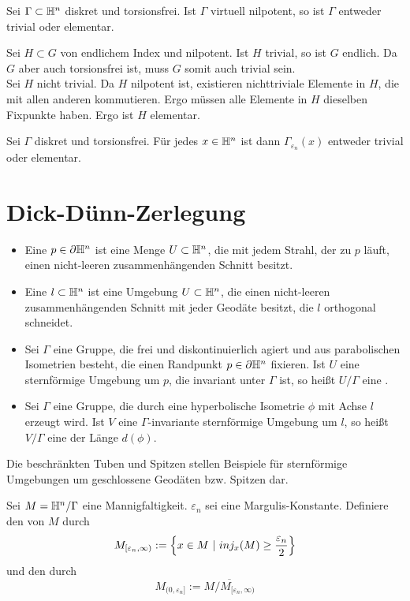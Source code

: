 \documentclass{book}
\renewcommand{\epsilon}{\varepsilon}
\newcommand{\thick}{M_{[\epsilon_n, \infty)}}
\newcommand{\thin}{M_{(0,\epsilon_n]}}
\begin{document}
\Kor{}
Sei $\Gamma \subset \mathbb{H}^n$ diskret und torsionsfrei. Ist $\Gamma $ virtuell nilpotent, so ist $\Gamma$ entweder trivial oder elementar.
\begin{Beweis}{}
	Sei $H \subset G$ von endlichem Index und nilpotent. Ist $H$ trivial, so ist $G$ endlich. Da $G$ aber auch torsionsfrei ist, muss $G$ somit auch trivial sein.\\
	Sei $H$ nicht trivial. Da $H$ nilpotent ist, existieren nichttriviale Elemente in $H$, die mit allen anderen kommutieren. Ergo müssen alle Elemente in $H$ dieselben Fixpunkte haben. Ergo ist $H$ elementar.
\end{Beweis}

\Kor{}
Sei $\Gamma$ diskret und torsionsfrei. Für jedes $x\in \mathbb{H}^n$ ist dann $\Gamma_{\epsilon_n}(x)$ entweder trivial oder elementar.

\section{Dick-Dünn-Zerlegung}

\Def{}
\begin{itemize}
	\item Eine  $p \in \partial\mathbb{H}^n$ ist eine Menge $U \subset \mathbb{H}^n$, die mit jedem Strahl, der zu $p$ läuft, einen nicht-leeren zusammenhängenden Schnitt besitzt.
	\item Eine  $l \subset \mathbb{H}^n$ ist eine Umgebung $U \subset \mathbb{H}^n$, die einen nicht-leeren zusammenhängenden Schnitt mit jeder Geodäte besitzt, die $l$ orthogonal schneidet.
	\item Sei $\Gamma$ eine Gruppe, die frei und diskontinuierlich agiert und aus parabolischen Isometrien besteht, die einen Randpunkt $p\in \partial\mathbb{H}^n$ fixieren. Ist $U$ eine sternförmige Umgebung um $p$, die invariant unter $\Gamma$ ist, so heißt $U / \Gamma$ eine .
	\item Sei $\Gamma$ eine Gruppe, die durch eine hyperbolische Isometrie $\phi$ mit Achse $l$ erzeugt wird. Ist $V$ eine $\Gamma$-invariante sternförmige Umgebung um $l$, so heißt $V / \Gamma$ eine  der Länge $d(\phi)$.
\end{itemize}
\Bem{}
Die beschränkten Tuben und Spitzen stellen Beispiele für sternförmige Umgebungen um geschlossene Geodäten bzw. Spitzen dar.


\Def{}
Sei $M = \mathbb{H}^n / \Gamma$ eine Mannigfaltigkeit. $\epsilon_n$ sei eine Margulis-Konstante. Definiere den  von $M$ durch
\[ \thick := \set{ x \in M }{inj_x(M) \geq \frac{\epsilon_n}{2}} \]
und den  durch
\[ \thin := \overline{ M/\thick } \]
\end{document}
